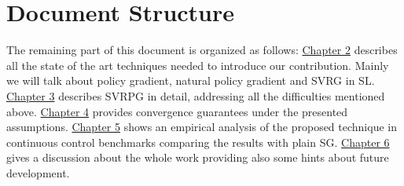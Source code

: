 \section{Document Structure}
The remaining part of this document is organized as follows:\newline
\newline
\hyperref[chap:art]{Chapter 2} describes all the state of the art techniques needed to introduce our contribution. Mainly we will talk about policy gradient, natural policy gradient and \acs{SVRG} in \acs{SL}.\newline
\hyperref[chap:algorithm]{Chapter 3} describes \acs{SVRPG} in detail, addressing all the difficulties mentioned above.\newline
\hyperref[chap:convergence]{Chapter 4} provides convergence guarantees under the presented assumptions.\newline
\hyperref[chap:experiments]{Chapter 5} shows an empirical analysis of the proposed technique in continuous control benchmarks comparing the results with plain \acs{SG}.\newline
\hyperref[chap:conclusions]{Chapter 6} gives a discussion about the whole work providing also some hints about future development.
